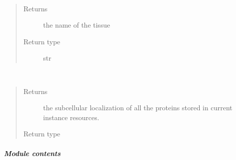 \documentclass[letterpaper,10pt,english]{sphinxmanual}
\begin{document}
\begin{fulllineitems}

\begin{fulllineitems}
\label{\detokenize{IPTK.Classes:IPTK.Classes.Tissue.Tissue.get_name}}~\begin{quote}\begin{description}
\item[{Returns}] \leavevmode
the name of the tissue

\item[{Return type}] \leavevmode
str

\end{description}\end{quote}

\end{fulllineitems}


\begin{fulllineitems}
\label{\detokenize{IPTK.Classes:IPTK.Classes.Tissue.Tissue.get_subCellular_locations}}~\begin{quote}\begin{description}
\item[{Returns}] \leavevmode
the sub\sphinxhyphen{}cellular localization of all the proteins stored in current instance resources.

\item[{Return type}] \leavevmode
{\hyperref[\detokenize{IPTK.Classes:IPTK.Classes.Database.CellularLocationDB}]{}}

\end{description}\end{quote}

\end{fulllineitems}


\end{fulllineitems}



\subparagraph{Module contents}
\label{\detokenize{IPTK.Classes:module-IPTK.Classes}}\label{\detokenize{IPTK.Classes:module-contents}}
\end{document}
